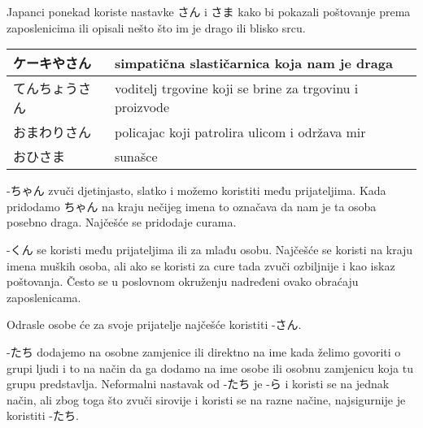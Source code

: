 	\vspace{10pt}
	
	
	Japanci ponekad koriste nastavke さん i さま kako bi pokazali poštovanje prema zaposlenicima ili opisali nešto što im je drago ili blisko srcu.
	
	\vspace{10pt}	
	

\begin{tabular}{|l|p{400pt}|}
		\hline
		ケーキやさん&simpatična slastičarnica koja nam je draga\\\hline
		てんちょうさん&voditelj trgovine koji se brine za trgovinu i proizvode\\\hline
		おまわりさん&policajac koji patrolira ulicom i održava mir\\\hline
		おひさま&sunašce\\\hline
	\end{tabular}

	\vspace{10pt}	
	\newpage
	
	-ちゃん zvuči djetinjasto, slatko i možemo koristiti među prijateljima. Kada pridodamo ちゃん na kraju nečijeg imena to označava da nam je ta osoba posebno draga. Najčešće se pridodaje curama.
	
	\vspace{10pt}	
	
	-くん se koristi među prijateljima ili za mlađu osobu. Najčešće se koristi na kraju imena muških osoba, ali ako se koristi za cure tada zvuči ozbiljnije i kao iskaz poštovanja. Često se u poslovnom okruženju nadređeni ovako obraćaju zaposlenicama.
	
	\vspace{10pt}

Odrasle osobe će za svoje prijatelje najčešće koristiti -さん.

	\vspace{10pt}
	
	-たち dodajemo na osobne zamjenice ili direktno na ime kada želimo govoriti o grupi ljudi i to na način da ga dodamo na ime osobe ili osobnu zamjenicu koja tu grupu predstavlja. Neformalni nastavak od -たち je -ら i koristi se na jednak način, ali zbog toga što zvuči sirovije i koristi se na razne načine, najsigurnije je koristiti -たち.


	\begin{reibun}
	\end{reibun}

